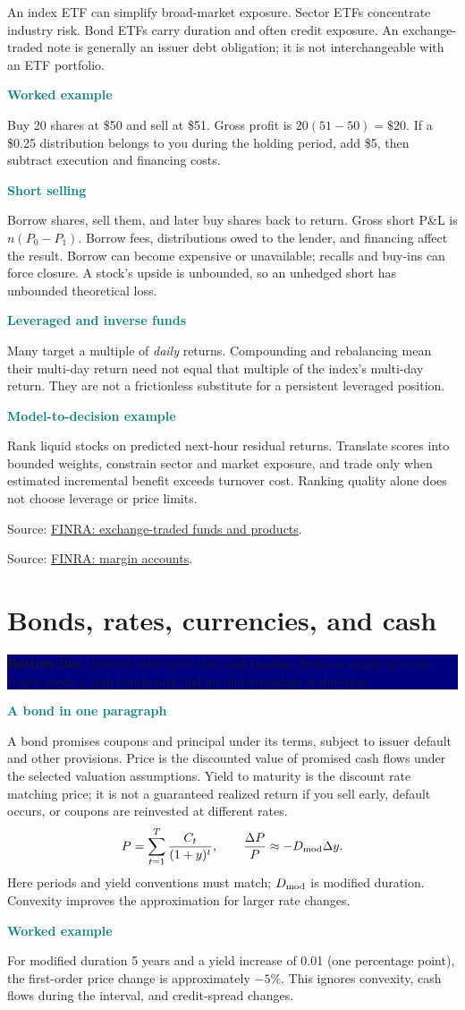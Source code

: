 \documentclass[10pt,letterpaper]{article}
\newcommand{\bl}[1]{\noindent\colorbox{navy}{\parbox{\dimexpr\linewidth-2\fboxsep}{\color{white}\textbf{Bottom line.} #1}}\par\medskip}
\newcommand{\topic}[2]{\clearpage\section{#1}\bl{#2}}
\newcommand{\sub}[1]{\par\textbf{\textcolor{teal}{#1}}\par}
\newcommand{\ex}[1]{\sub{Worked example}#1}
\newcommand{\src}[2]{\par{\footnotesize Source: \href{#1}{#2}.}}
\begin{document}
An index ETF can simplify broad-market exposure. Sector ETFs concentrate industry risk. Bond ETFs carry duration and often credit exposure. An exchange-traded note is generally an issuer debt obligation; it is not interchangeable with an ETF portfolio.
\ex{Buy 20 shares at \$50 and sell at \$51. Gross profit is $20(51-50)=\$20$. If a \$0.25 distribution belongs to you during the holding period, add \$5, then subtract execution and financing costs.}
\sub{Short selling}
Borrow shares, sell them, and later buy shares back to return. Gross short P\&L is $n(P_0-P_1)$. Borrow fees, distributions owed to the lender, and financing affect the result. Borrow can become expensive or unavailable; recalls and buy-ins can force closure. A stock's upside is unbounded, so an unhedged short has unbounded theoretical loss.
\sub{Leveraged and inverse funds}
Many target a multiple of \emph{daily} returns. Compounding and rebalancing mean their multi-day return need not equal that multiple of the index's multi-day return. They are not a frictionless substitute for a persistent leveraged position.
\sub{Model-to-decision example}
Rank liquid stocks on predicted next-hour residual returns. Translate scores into bounded weights, constrain sector and market exposure, and trade only when estimated incremental benefit exceeds turnover cost. Ranking quality alone does not choose leverage or price limits.
\src{https://www.finra.org/investors/investing/investment-products/exchange-traded-funds-and-products}{FINRA: exchange-traded funds and products}
\src{https://www.finra.org/rules-guidance/key-topics/margin-accounts}{FINRA: margin accounts}
\topic{Bonds, rates, currencies, and cash}{Interest rates price time and funding. Even an equity or event trader needs a cash benchmark and an understanding of duration.}
\sub{A bond in one paragraph}
A bond promises coupons and principal under its terms, subject to issuer default and other provisions. Price is the discounted value of promised cash flows under the selected valuation assumptions. Yield to maturity is the discount rate matching price; it is not a guaranteed realized return if you sell early, default occurs, or coupons are reinvested at different rates.
\[P=\sum_{t=1}^{T}\frac{C_t}{(1+y)^t},\qquad
\frac{\Delta P}{P}\approx-D_{\rm mod}\Delta y.\]
Here periods and yield conventions must match; $D_{\rm mod}$ is modified duration. Convexity improves the approximation for larger rate changes.
\ex{For modified duration 5 years and a yield increase of 0.01 (one percentage point), the first-order price change is approximately $-5\%$. This ignores convexity, cash flows during the interval, and credit-spread changes.}
\end{document}
